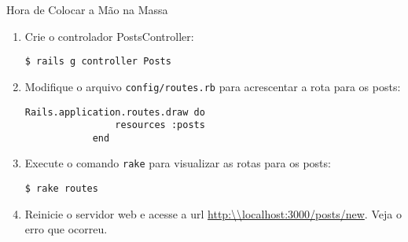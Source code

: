 \begin{frame}{Hora de Colocar a Mão na Massa}
\begin{enumerate}
		\item Crie o controlador PostsController:
		\begin{lstlisting}[style=BashInputBasicStyle]
			$ rails g controller Posts 		
		\end{lstlisting}

		\item Modifique o arquivo \verb|config/routes.rb| para acrescentar a rota para
		os posts:
		\begin{lstlisting}[style=RubyInputStyle]
			Rails.application.routes.draw do 
				resources :posts
			end 
		\end{lstlisting}	
		
		\item Execute o comando \verb!rake! para visualizar as rotas para os
		posts:
		\begin{lstlisting}[style=BashInputBasicStyle]
			$ rake routes
		\end{lstlisting}
		
		\item Reinicie o servidor web e acesse a url \url{http:\\localhost:3000/posts/new}. Veja o erro que ocorreu.

	\end{enumerate}
\end{frame}